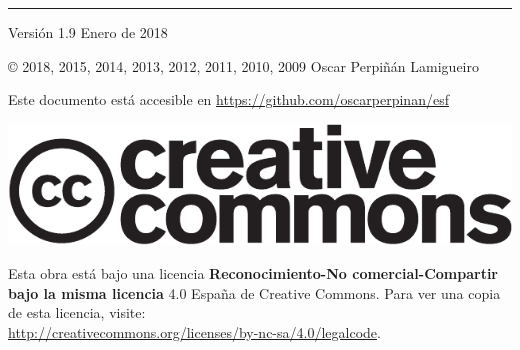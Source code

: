 
\chapterprecis{\vfill{}
}
\rule[.5ex]{\linewidth}{1pt} 

Versión 1.9 Enero de 2018

© 2018, 2015, 2014, 2013, 2012, 2011, 2010, 2009 Oscar Perpiñán Lamigueiro

Este documento está accesible en \url{https://github.com/oscarperpinan/esf}

\begin{center}
\includegraphics[scale=0.5]{../figs/cc-logo}
\par\end{center}

Esta obra está bajo una licencia \textbf{Reconocimiento-No comercial-Compartir
bajo la misma licencia} 4.0 España de Creative Commons. Para ver una
copia de esta licencia, visite:\\
 \url{http://creativecommons.org/licenses/by-nc-sa/4.0/legalcode}.

